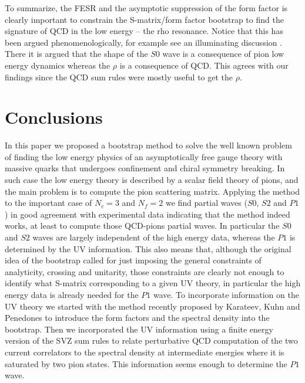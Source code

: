 \documentclass[12pt,letterpaper]{article}
\begin{document}
To summarize, the FESR and the asymptotic suppression of the form factor is clearly important to constrain the S-matrix/form factor bootstrap to find the signature of QCD in the low energy -- the rho resonance. Notice that this has been argued phenomenologically, for example see an illuminating discussion \cite{Colangelo:2001df}. There it is argued that the shape of the $S0$ wave is a consequence of pion low energy dynamics whereas the $\rho$ is a consequence of QCD. This agrees with our findings since the QCD sum rules were mostly useful to get the $\rho$.  

\section{Conclusions}

    In this paper we proposed a bootstrap method to solve the well known problem of finding the low energy physics of an asymptotically free gauge theory with massive quarks that undergoes confinement and chiral symmetry breaking. In such case the low energy theory is described by a scalar field theory of pions, and the main problem is to compute the pion scattering matrix. Applying the method to the important case of $N_c=3$ and $N_f=2$ we find partial waves ($S0$, $S2$ and $P1$) in good agreement with experimental data indicating that the method indeed works, at least to compute those QCD-pions partial waves.   In particular the $S0$ and $S2$ waves are largely independent of the high energy data, whereas the $P1$ is determined by the UV information. 
    This also means that, although the original idea of the bootstrap called for just imposing the general constraints of analyticity, crossing and unitarity, those constraints are clearly not enough to identify what S-matrix corresponding to a given UV theory, in particular the high energy data is already needed for the $P1$ wave. To incorporate information on the UV theory we started with the method recently proposed by Karateev, Kuhn and Penedones to introduce the form factors and the spectral density into the bootstrap. Then we incorporated the UV information using a finite energy version of the SVZ sum rules to relate perturbative QCD computation of the two current correlators to the spectral density at intermediate energies where it is saturated by two pion states. This information seems enough to determine the $P1$ wave.     
    
\end{document}
